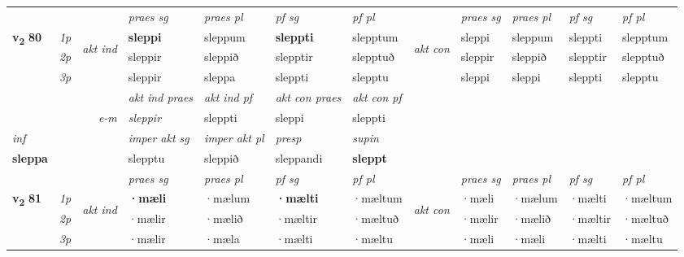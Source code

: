 \begin{longtable}[l]{X>{\footnotesize\itshape}llXXXXlXXXX}
 & &   & \textit{praes sg}  & \textit{praes pl}    & \textit{ pf sg} & \textit{pf pl} & & \textit{praes sg}  & \textit{praes pl}    & \textit{pf sg} & \textit{pf pl }  \\ \cmidrule{4-7} \cmidrule{9-12}
 \multirow{2}{*}{{{\textbf{v{\textsubscript{2}}} \Large{\textbf{80}}}}}  & 1p & \multirow{3}{*}{\begin{turn}{90}\textit{akt ind}\end{turn}} & \textbf{sleppi} & sleppum & \textbf{sleppti} & slepptum & \multirow{3}{*}{\begin{turn}{90}\textit{akt con}\end{turn}} &sleppi & sleppum & sleppti & slepptum\\*
 & 2p &  &  sleppir  & sleppið & slepptir & slepptuð & & sleppir & sleppið & slepptir & slepptuð \\*
 & 3p &  & sleppir & sleppa & sleppti & slepptu & & sleppi & sleppi& sleppti & slepptu \\*
\cmidrule{4-7} \cmidrule{9-12}

   && &  \textit{akt ind praes} & \textit{akt ind pf} & \textit{akt con praes} & \textit{akt con pf} \\*
\multicolumn{3}{r}{\textit{e-m}} & sleppir & sleppti & sleppi & sleppti \\*

\cmidrule{4-7}
   {\textit{inf}} & &  & \textit{imper akt sg} & \textit{imper akt pl}   & \textit{presp} & \textit{supin}   \\*
  {\textbf{sleppa}} & && slepptu  & sleppið   & sleppandi &  \textbf{sleppt}   \\*

\midrule

 & &   & \textit{praes sg}  & \textit{praes pl}    & \textit{ pf sg} & \textit{pf pl} & & \textit{praes sg}  & \textit{praes pl}    & \textit{pf sg} & \textit{pf pl }  \\ \cmidrule{4-7} \cmidrule{9-12}
 \multirow{2}{*}{{{\textbf{v{\textsubscript{2}}} \Large{\textbf{81}}}}}  & 1p & \multirow{3}{*}{\begin{turn}{90}\textit{akt ind}\end{turn}} & \textbf{·mæli} & ·mælum & \textbf{·mælti} & ·mæltum & \multirow{3}{*}{\begin{turn}{90}\textit{akt con}\end{turn}} &·mæli & ·mælum & ·mælti & ·mæltum\\*
 & 2p &  &  ·mælir  & ·mælið & ·mæltir & ·mæltuð & & ·mælir & ·mælið & ·mæltir & ·mæltuð \\*
 & 3p &  & ·mælir & ·mæla & ·mælti & ·mæltu & & ·mæli & ·mæli& ·mælti & ·mæltu \\*
\cmidrule{4-7} \cmidrule{9-12}


\end{longtable}
